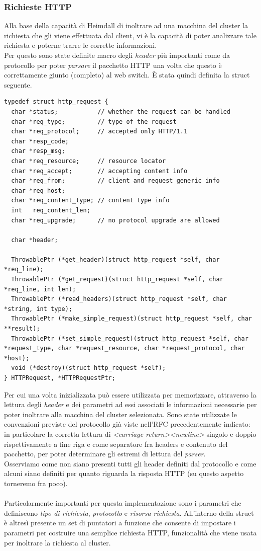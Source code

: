 \documentclass[italian]{tktltiki2}
\begin{document}
\subsubsection*{Richieste HTTP}
Alla base della capacità di Heimdall di inoltrare ad una macchina del cluster la richiesta che gli viene effettuata dal client, vi è la capacità di poter analizzare tale richiesta e poterne trarre le corrette informazioni. \\
Per questo sono state definite macro degli \emph{header} più importanti come da protocollo\cite{http_1.1} per poter \emph{parsare} il pacchetto HTTP una volta che questo è correttamente giunto (completo) al web switch. È stata quindi definita la struct seguente.
\begin{lstlisting}
typedef struct http_request {
  char *status;           // whether the request can be handled
  char *req_type;         // type of the request
  char *req_protocol;     // accepted only HTTP/1.1
  char *resp_code;
  char *resp_msg;
  char *req_resource;     // resource locator
  char *req_accept;       // accepting content info
  char *req_from;         // client and request generic info
  char *req_host;
  char *req_content_type; // content type info
  int   req_content_len;
  char *req_upgrade;      // no protocol upgrade are allowed

  char *header;                                

  ThrowablePtr (*get_header)(struct http_request *self, char *req_line);
  ThrowablePtr (*get_request)(struct http_request *self, char *req_line, int len);
  ThrowablePtr (*read_headers)(struct http_request *self, char *string, int type);
  ThrowablePtr (*make_simple_request)(struct http_request *self, char **result);
  ThrowablePtr (*set_simple_request)(struct http_request *self, char *request_type, char *request_resource, char *request_protocol, char *host);
  void (*destroy)(struct http_request *self);
} HTTPRequest, *HTTPRequestPtr;

\end{lstlisting}
Per cui una volta inizializzata può essere utilizzata per memorizzare, attraverso la lettura degli \emph{header} e dei parametri ad essi associati le informazioni necessarie per poter inoltrare alla macchina del cluster selezionata. Sono state utilizzate le convenzioni previste del protocollo già viste nell'RFC precedentemente indicato: in particolare la corretta lettura di \emph{<carriage return><newline>} singolo e doppio rispettivamente a fine riga e come separatore fra headers e contenuto del pacchetto, per poter determinare gli estremi di lettura del \emph{parser}.
\\ 
Osserviamo come non siano presenti tutti gli header definiti dal protocollo e come alcuni siano definiti per quanto riguarda la risposta HTTP (su questo aspetto torneremo fra poco). 
\\
\\
Particolarmente importanti per questa implementazione sono i parametri che definiscono \emph{tipo di richiesta}, \emph{protocollo} e \emph{risorsa richiesta}. All'interno della struct è altresì presente un set di puntatori a funzione che consente di impostare i parametri per costruire una semplice richiesta HTTP, funzionalità che viene usata per inoltrare la richiesta al cluster.
\end{document}
